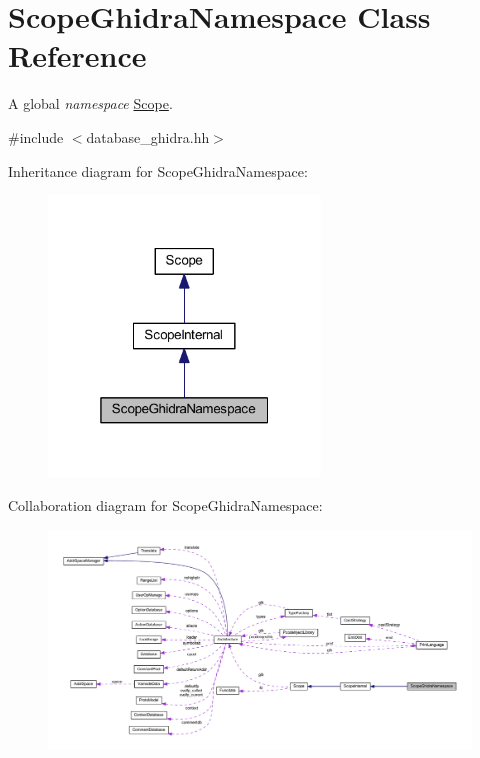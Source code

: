 \hypertarget{class_scope_ghidra_namespace}{}\section{Scope\+Ghidra\+Namespace Class Reference}
\label{class_scope_ghidra_namespace}


A global {\itshape namespace} \mbox{\hyperlink{class_scope}{Scope}}.  




{\ttfamily \#include $<$database\+\_\+ghidra.\+hh$>$}



Inheritance diagram for Scope\+Ghidra\+Namespace\+:
\nopagebreak
\begin{figure}[H]
\begin{center}
\leavevmode
\includegraphics[width=205pt]{class_scope_ghidra_namespace__inherit__graph}
\end{center}
\end{figure}


Collaboration diagram for Scope\+Ghidra\+Namespace\+:
\nopagebreak
\begin{figure}[H]
\begin{center}
\leavevmode
\includegraphics[width=350pt]{class_scope_ghidra_namespace__coll__graph}
\end{center}
\end{figure}
